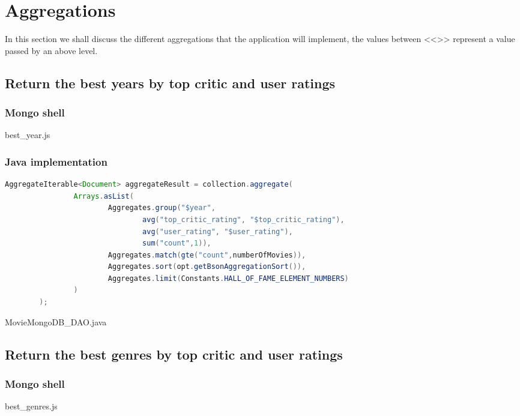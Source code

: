 \section{Aggregations}
In this section we shall discuss the different aggregations that the application will implement, the values between <<>> represent a value passed by an above level.

\subsection{Return the best years by top critic and user ratings}\label{subsec:bestYear}
\subsubsection{Mongo shell}

\caption{best_year.js}
\subsubsection{Java implementation}
\begin{lstlisting}[language=Java]
AggregateIterable<Document> aggregateResult = collection.aggregate(
                Arrays.asList(
                        Aggregates.group("$year",
                                avg("top_critic_rating", "$top_critic_rating"),
                                avg("user_rating", "$user_rating"),
                                sum("count",1)),
                        Aggregates.match(gte("count",numberOfMovies)),
                        Aggregates.sort(opt.getBsonAggregationSort()),
                        Aggregates.limit(Constants.HALL_OF_FAME_ELEMENT_NUMBERS)
                )
        );
\end{lstlisting}
\caption{MovieMongoDB_DAO.java}
\subsection{Return the best genres by top critic and user ratings}\label{subsec:HOFGenres}
\subsubsection{Mongo shell}

\caption{best_genres.js}
